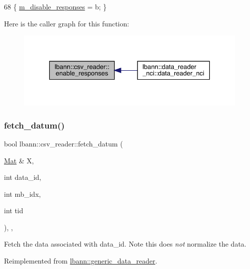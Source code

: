 \begin{DoxyCode}
68 \{ \hyperlink{classlbann_1_1csv__reader_a1e133c3585df5f131b4772f618e77ad2}{m\_disable\_responses} = b; \}
\end{DoxyCode}
Here is the caller graph for this function\+:\nopagebreak
\begin{figure}[H]
\begin{center}
\leavevmode
\includegraphics[width=329pt]{classlbann_1_1csv__reader_a7f2f980b860939e561d669575da9fb49_icgraph}
\end{center}
\end{figure}
\mbox{\label{classlbann_1_1csv__reader_a1fbac4ff1c24ec7f41f55fc8a43515c6}} 
\subsubsection{\texorpdfstring{fetch\+\_\+datum()}{fetch\_datum()}}
{\footnotesize\ttfamily bool lbann\+::csv\+\_\+reader\+::fetch\+\_\+datum (\begin{DoxyParamCaption}\item[{\hyperlink{base_8hpp_a68f11fdc31b62516cb310831bbe54d73}{Mat} \&}]{X,  }\item[{int}]{data\+\_\+id,  }\item[{int}]{mb\+\_\+idx,  }\item[{int}]{tid }\end{DoxyParamCaption})\hspace{0.3cm}{\ttfamily [override]}, {\ttfamily [protected]}, {\ttfamily [virtual]}}

Fetch the data associated with data\+\_\+id. Note this does {\itshape not} normalize the data. 

Reimplemented from \hyperlink{classlbann_1_1generic__data__reader_a0a3cd87ed4a7057df185e0087f2d21c1}{lbann\+::generic\+\_\+data\+\_\+reader}.



